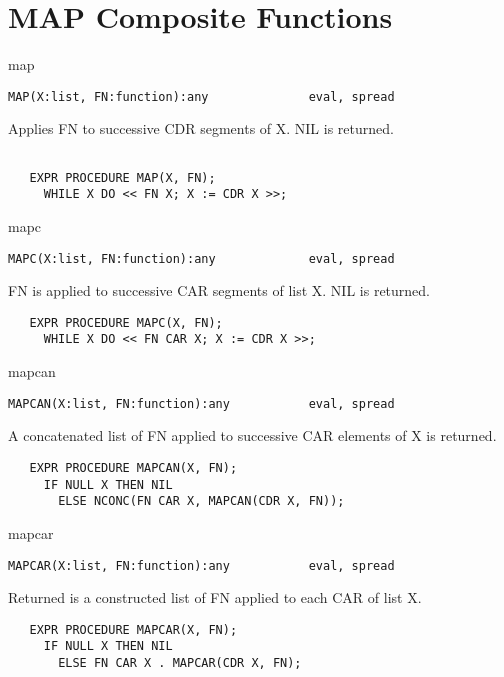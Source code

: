 \section{MAP Composite Functions}


\begin{Function}{map}
\begin{verbatim}
MAP(X:list, FN:function):any              eval, spread
\end{verbatim}
   Applies FN to successive CDR segments of X. NIL is returned.
\begin{verbatim}

   EXPR PROCEDURE MAP(X, FN);
     WHILE X DO << FN X; X := CDR X >>;
\end{verbatim}
\end{Function}
\begin{Function}{mapc}
\begin{verbatim}
MAPC(X:list, FN:function):any             eval, spread
\end{verbatim}
   FN  is applied  to successive CAR  segments of list  X. NIL is
   returned.
\begin{verbatim}
   EXPR PROCEDURE MAPC(X, FN);
     WHILE X DO << FN CAR X; X := CDR X >>;
\end{verbatim}
\end{Function}
\begin{Function}{mapcan}
\begin{verbatim}
MAPCAN(X:list, FN:function):any           eval, spread
\end{verbatim}
   A  concatenated list of FN  applied to successive CAR elements
   of X is returned.
\begin{verbatim}
   EXPR PROCEDURE MAPCAN(X, FN);
     IF NULL X THEN NIL
       ELSE NCONC(FN CAR X, MAPCAN(CDR X, FN));
\end{verbatim}
\end{Function}
\begin{Function}{mapcar}
\begin{verbatim}
MAPCAR(X:list, FN:function):any           eval, spread
\end{verbatim}
   Returned  is a constructed  list of FN applied  to each CAR of
   list X.
\begin{verbatim}
   EXPR PROCEDURE MAPCAR(X, FN);
     IF NULL X THEN NIL
       ELSE FN CAR X . MAPCAR(CDR X, FN);
\end{verbatim}

\end{Function}
